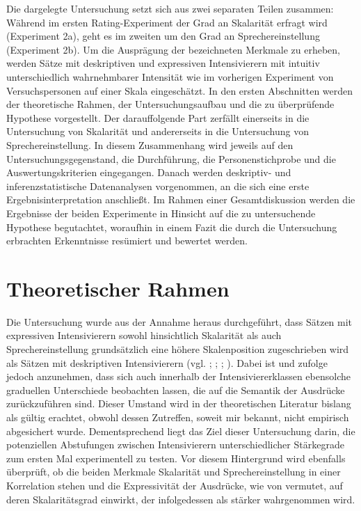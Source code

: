 Die dargelegte Untersuchung setzt sich aus zwei separaten Teilen zusammen: Während im ersten Rating-Experiment der Grad an Skalarität erfragt wird (Experiment 2a), geht es im zweiten um den Grad an Sprechereinstellung (Experiment 2b). Um die Ausprägung der bezeichneten Merkmale zu erheben, werden Sätze mit deskriptiven und expressiven Intensivierern mit intuitiv unterschiedlich wahrnehmbarer Intensität wie im vorherigen Experiment von Versuchspersonen auf einer Skala eingeschätzt. In den ersten Abschnitten werden der theoretische Rahmen, der Untersuchungsaufbau und die zu überprüfende Hypothese vorgestellt. Der darauffolgende Part zerfällt einerseits in die Untersuchung von Skalarität und andererseits in die Untersuchung von Sprechereinstellung. In diesem Zusammenhang wird jeweils auf den Untersuchungsgegenstand, die Durchführung, die Personenstichprobe und die Auswertungskriterien eingegangen. Danach werden deskriptiv- und inferenzstatistische Datenanalysen vorgenommen, an die sich eine erste Ergebnisinterpretation anschließt. Im Rahmen einer Gesamtdiskussion werden die Ergebnisse der beiden Experimente in Hinsicht auf die zu untersuchende Hypothese begutachtet, woraufhin in einem Fazit die durch die Untersuchung erbrachten Erkenntnisse resümiert und {bewertet werden}.





\section{Theoretischer Rahmen}\label{abs:theo}
Die Untersuchung wurde aus der Annahme heraus durchgeführt, dass Sätzen mit expressiven Intensivierern sowohl hinsichtlich Skalarität als auch Sprechereinstellung grundsätzlich eine höhere Skalenposition zugeschrieben wird als Sätzen mit deskriptiven Intensivierern (vgl. {\citealt[315]{Lang.1983}}; \citealt[22]{Paradis.1997}; \citealt[57]{Ortner.2014}; \citealt[133]{Gutzmann.2019a}). Dabei ist {\citet[87]{Biedermann.1969}} und {\citet[408]{Breindl.2007}} zufolge jedoch anzunehmen, dass sich auch innerhalb der Intensiviererklassen ebensolche graduellen Unterschiede beobachten lassen, die auf die Semantik der Ausdrücke zurückzuführen sind. Dieser Umstand wird in der theoretischen Literatur bislang als gültig erachtet, obwohl dessen Zutreffen, soweit mir bekannt, nicht empirisch abgesichert wurde. Dementsprechend liegt das Ziel dieser Untersuchung darin, die potenziellen Abstufungen zwischen Intensivierern unterschiedlicher Stärkegrade zum ersten Mal experimentell zu testen. Vor diesem Hintergrund wird ebenfalls überprüft, ob die beiden Merkmale Skalarität und Sprechereinstellung in einer Korrelation stehen und die Expressivität der Ausdrücke, wie von {\citet[133]{Gutzmann.2019a}} vermutet, auf deren Skalaritätsgrad einwirkt, der infolgedessen als stärker wahrgenommen wird.

